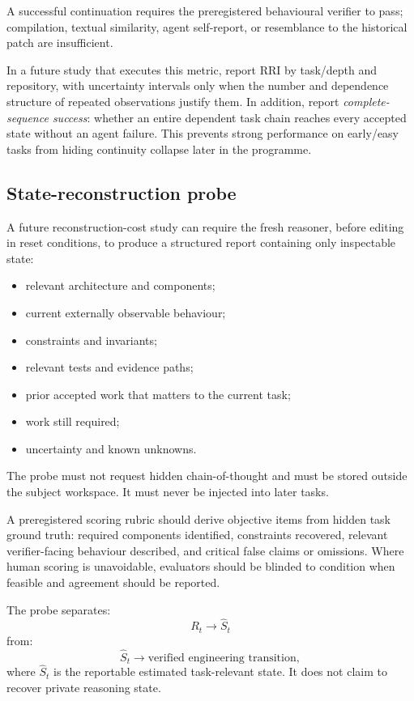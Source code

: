 A successful continuation requires the preregistered behavioural verifier to pass; compilation, textual similarity, agent self-report, or resemblance to the historical patch are insufficient.

In a future study that executes this metric, report RRI by task/depth and repository, with uncertainty intervals only when the number and dependence structure of repeated observations justify them. In addition, report \emph{complete-sequence success}: whether an entire dependent task chain reaches every accepted state without an agent failure. This prevents strong performance on early/easy tasks from hiding continuity collapse later in the programme.

\subsection{State-reconstruction probe}

A future reconstruction-cost study can require the fresh reasoner, before editing in reset conditions, to produce a structured report containing only inspectable state:
\begin{itemize}
    \item relevant architecture and components;
    \item current externally observable behaviour;
    \item constraints and invariants;
    \item relevant tests and evidence paths;
    \item prior accepted work that matters to the current task;
    \item work still required;
    \item uncertainty and known unknowns.
\end{itemize}

The probe must not request hidden chain-of-thought and must be stored outside the subject workspace. It must never be injected into later tasks.

A preregistered scoring rubric should derive objective items from hidden task ground truth: required components identified, constraints recovered, relevant verifier-facing behaviour described, and critical false claims or omissions. Where human scoring is unavoidable, evaluators should be blinded to condition when feasible and agreement should be reported.

The probe separates:
\begin{equation}
R_t \rightarrow \widehat{S}_t
\end{equation}
from:
\begin{equation}
\widehat{S}_t \rightarrow \text{verified engineering transition},
\end{equation}
where $\widehat{S}_t$ is the reportable estimated task-relevant state. It does not claim to recover private reasoning state.
